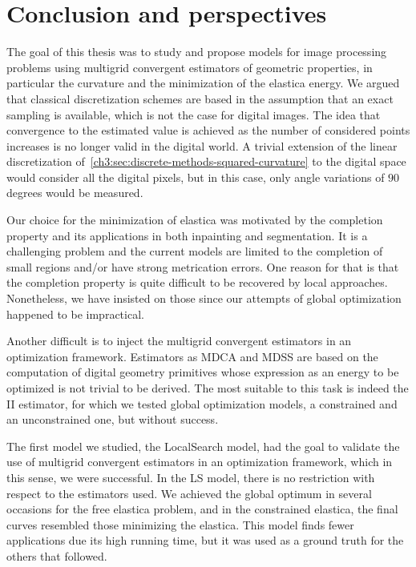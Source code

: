 \chapter{Conclusion and perspectives}
\label{chapter:conclusion-and-perspectives}

The goal of this thesis was to study and propose models for image processing problems using multigrid convergent estimators of geometric properties, in particular the curvature and the minimization of the elastica energy. We argued that classical discretization schemes are based in the assumption that an exact sampling is available, which is not the case for digital images. The idea that convergence to the estimated value is achieved as the number of considered points increases is no longer valid in the digital world. A trivial extension of the linear discretization of~\cref{ch3:sec:discrete-methods-squared-curvature} to the digital space would consider all the digital pixels, but in this case, only angle variations of $90$ degrees would be measured.

Our choice for the minimization of elastica was motivated by the completion property and its applications in both inpainting and segmentation. It is a challenging problem and the current models are limited to the completion of small regions and/or have strong metrication errors. One reason for that is that the completion property is quite difficult to be recovered by local approaches. Nonetheless, we have insisted on those since our attempts of global optimization happened to be impractical.

Another difficult is to inject the multigrid convergent estimators in an optimization framework. Estimators as MDCA and MDSS are based on the computation of digital geometry primitives whose expression as an energy to be optimized is not trivial to be derived. The most suitable to this task is indeed the II estimator, for which we tested global optimization models, a constrained and an unconstrained one, but without success.

The first model we studied, the LocalSearch model, had the goal to validate the use of  multigrid convergent estimators in an optimization framework, which in this sense, we were successful. In the LS model, there is no restriction with respect to the estimators used. We achieved the global optimum in several occasions for the free elastica problem, and in the constrained elastica, the final curves resembled those minimizing the elastica. This model finds fewer applications due its high running time, but it was used as a ground truth for the others that followed.

